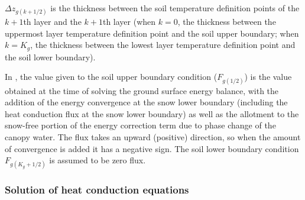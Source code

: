 \(\Delta z_{g(k+1/2)}\) is the thickness between the soil temperature definition points of the \(k+1\)th layer and the \(k+1\)th layer (when \(k=0\), the thickness between the uppermost layer
temperature definition point and the soil upper boundary; when \(k=K_g\), the thickness between the lowest layer temperature definition point and the soil lower boundary).

In \hyperref[eq291]{}, the value given to the soil upper boundary condition (\(F_{g(1/2)}\)) is the value obtained at the time of solving the ground surface energy balance, with the addition of the
energy convergence at the snow lower boundary (including the heat conduction flux at the snow lower boundary) as well as the allotment to the snow-free portion of the energy correction term due to
phase change of the canopy water. The flux takes an upward (positive) direction, so when the amount of convergence is added it has a negative sign. The soil lower boundary condition \(F_{g(K_g+1/2)}\)
is assumed to be zero flux.

\subsubsection{Solution of heat conduction equations}\label{solution-of-heat-conduction-equations}

